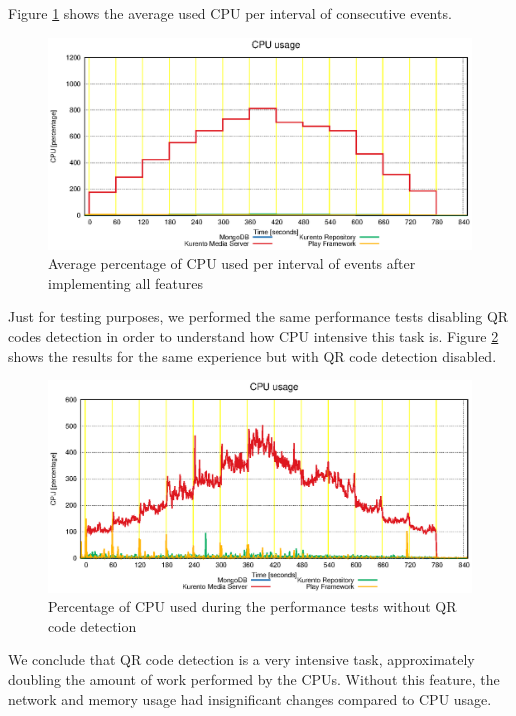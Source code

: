    Figure \ref{fig:summary_full_cpu} shows the average used \ac{CPU} per interval of consecutive events. 

\begin{figure}
  \centering
  \includegraphics[width=\textwidth]{stats/summary_full_cpu.eps}
  \caption{Average percentage of CPU used per interval of events after implementing all features}
  \label{fig:summary_full_cpu}
\end{figure}



  Just for testing purposes, we performed the same performance tests disabling \ac{QR} codes detection in order to understand how \ac{CPU} intensive this task is. Figure \ref{fig:test_without_qrcode_cpu} shows the results for the same experience but with \ac{QR} code detection disabled.

\begin{figure}
  \centering
  \includegraphics[width=\textwidth]{stats/test_without_qrcode_cpu.eps}
  \caption{Percentage of CPU used during the performance tests without QR code detection}
  \label{fig:test_without_qrcode_cpu}
\end{figure}

We conclude that \ac{QR} code detection is a very intensive task, approximately doubling the amount of work performed by the \ac{CPU}s. Without this feature, the network and memory usage had insignificant changes compared to \ac{CPU} usage.

